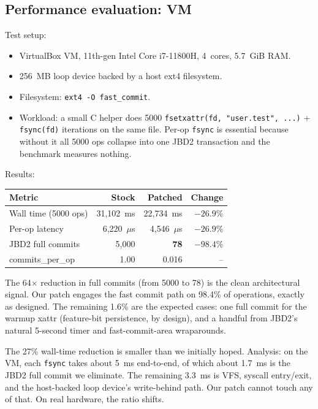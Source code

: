 \documentclass[11pt,a4paper]{article}
\begin{document}
\subsection{Performance evaluation: VM}

Test setup:
\begin{itemize}[leftmargin=*]
  \item VirtualBox VM, 11th-gen Intel Core i7-11800H, 4~cores,
        5.7~GiB RAM.
  \item 256~MB loop device backed by a host ext4 filesystem.
  \item Filesystem: \texttt{ext4 -O fast\_commit}.
  \item Workload: a small C helper does 5000
        \texttt{fsetxattr(fd, "user.test", ...)} +
        \texttt{fsync(fd)} iterations on the same file. Per-op
        \texttt{fsync} is essential because without it all 5000 ops
        collapse into one JBD2 transaction and the benchmark
        measures nothing.
\end{itemize}

Results:

\begin{center}
\begin{tabular}{lrrr}
\toprule
Metric & Stock & Patched & Change \\
\midrule
Wall time (5000 ops) & 31{,}102~ms & 22{,}734~ms & $-26.9\%$ \\
Per-op latency       & 6{,}220~$\mu$s & 4{,}546~$\mu$s & $-26.9\%$ \\
JBD2 full commits    & 5{,}000 & \textbf{78} & $\mathbf{-98.4\%}$ \\
commits\_per\_op     & 1.00  & 0.016 & -- \\
\bottomrule
\end{tabular}
\end{center}

The 64$\times$ reduction in full commits (from 5000 to 78) is the
clean architectural signal. Our patch engages the fast commit path
on 98.4\% of operations, exactly as designed. The remaining 1.6\%
are the expected cases: one full commit for the warmup xattr
(feature-bit persistence, by design), and a handful from JBD2's
natural 5-second timer and fast-commit-area wraparounds.

The 27\% wall-time reduction is smaller than we initially hoped.
Analysis: on the VM, each \texttt{fsync} takes about 5~ms end-to-end,
of which about 1.7~ms is the JBD2 full commit we eliminate. The
remaining 3.3~ms is VFS, syscall entry/exit, and the host-backed
loop device's write-behind path. Our patch cannot touch any of
that. On real hardware, the ratio shifts.
\end{document}
